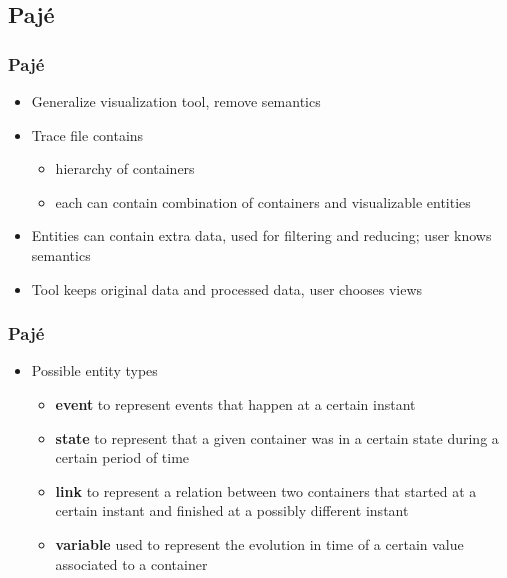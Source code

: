 \subsection{Paj\'e}
\frame
{
\frametitle{Paj\'e} 
\begin{itemize}
\item Generalize visualization tool, remove semantics
\item Trace file contains
\begin{itemize}
\item{hierarchy of containers}
\item{each can contain combination of containers and visualizable entities}
\end{itemize}
\item Entities can contain extra data, used for filtering and reducing; user knows semantics
\item Tool keeps original data and processed data, user chooses views
\end{itemize}
}
\frame
{
\frametitle{Paj\'e} 

\begin{itemize}
\item[] Possible entity types
\begin{itemize}
\item \textbf{event} to represent events that happen at a certain
instant
\item \textbf{state} to represent that
a given container was in a certain state during a certain period of
time
\item\textbf{link} to represent a relation
between two containers that started at a certain instant and
finished at a possibly different instant
\item\textbf{variable} used to represent the evolution in time of a
certain value associated to a container
\end{itemize}
\end{itemize}
}
